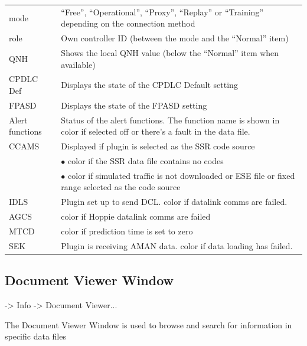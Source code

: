 \documentclass[a4paper,oneside,11pt]{memoir}
\begin{document}
\begin{longtable}{p{2.5cm} p{10cm}}
    mode                & “Free”, “Operational”, “Proxy”, “Replay” or “Training” depending on the connection method \\
    role                & Own controller ID (between the mode and the “Normal” item)\\
    QNH                 & Shows the local QNH value (below the “Normal” item when available)\\
    CPDLC Def           & Displays the state of the CPDLC Default setting\\
    FPASD               & Displays the state of the FPASD setting \\
    Alert functions     & Status of the alert functions. The function name is shown in {Warning} color if selected off or there’s a fault in the data file.\\
    CCAMS               & Displayed if plugin is selected as the SSR code source\\
                        & $\bullet$ {Urgency} color if the SSR data file contains no codes\\
                        & $\bullet$ {Warning} color if simulated traffic is not downloaded or ESE file or fixed range selected as the code source\\
    IDLS                & Plugin set up to send DCL. {Warning} color if datalink comms are failed.\\
    AGCS                & {Warning} color if Hoppie datalink comms are failed\\
    MTCD                & {Warning} color if prediction time is set to zero    \\
    SEK                 & Plugin is receiving AMAN data. {Warning} color if data loading has failed.\\
\end{longtable}

\subsection{Document Viewer Window}
\label{win:dvw}

 -> Info -> Document Viewer...

\bigskip


The Document Viewer Window is used to browse and search for information in specific data files
\end{document}
